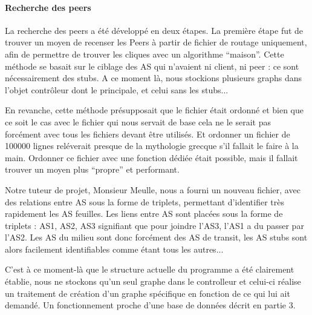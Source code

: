 \paragraph{Recherche des peers\\}
\par La recherche des peers a été développé en deux étapes. La première étape fut de trouver un moyen de recenser les Peers à partir de fichier de routage uniquement, afin de permettre de trouver les cliques avec un algorithme ``maison''. Cette méthode se basait sur le ciblage des AS qui n'avaient ni client, ni peer : ce sont n\'ecessairement des stubs. A ce moment là, nous stockions plusieurs graphs dans l'objet contrôleur dont le principale, et celui sans les stubs... 

En revanche, cette méthode présupposait que le fichier était ordonné et bien que ce soit le cas avec le fichier qui nous servait de base cela ne le serait pas forcément avec tous les fichiers devant être utilisés. Et ordonner un fichier de 100000 lignes reléverait presque de la mythologie grecque s'il fallait le faire à la main. Ordonner ce fichier avec une fonction dédiée était possible, mais il fallait trouver un moyen plus ``propre'' et performant.

\par Notre tuteur de projet, Monsieur Meulle, nous a fourni un nouveau fichier, avec des relations entre AS sous la forme de triplets, permettant d'identifier tr\`es rapidement les AS feuilles.
Les liens entre AS sont plac\'ees sous la forme de triplets : {AS1, AS2, AS3} signifiant que pour joindre l'AS3, l'AS1 a du passer par l'AS2. Les AS du milieu sont donc forcément des AS de transit, les AS stubs sont alors facilement identifiables comme \'etant tous les autres... 

C'est à ce moment-là que le structure actuelle du programme a été clairement établie, nous ne stockons qu'un seul graphe dans le controlleur et celui-ci réalise un traitement de création d'un graphe spécifique en fonction de ce qui lui ait demandé. Un fonctionnement proche d'une base de données décrit en partie 3.




